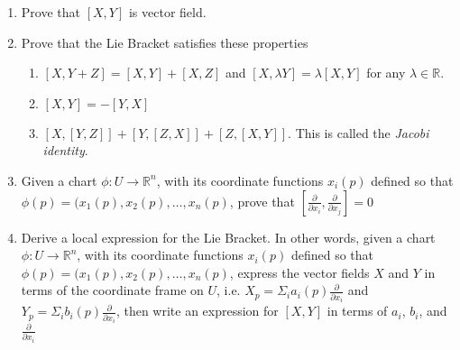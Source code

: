 \begin{enumerate}
\begin{enumerate}
\item Prove that $[X,Y]$ is vector field.
\item Prove that the Lie Bracket satisfies these properties
  \begin{enumerate}
\item $[X, Y + Z] = [X, Y] + [X, Z]$ and $[X, \lambda Y] = \lambda [X, Y]$  for any $\lambda \in \mathbb{R}$.
\item $[X, Y] = -[Y, X]$
\item $[X, [Y , Z]] + [Y, [Z , X]] + [Z, [X , Y]]$. This is called the \emph{Jacobi identity}.
  \end{enumerate}
  \item Given a chart $\phi : U \to \mathbb{R}^n$, with its coordinate functions $x_i(p)$ defined so that $\phi(p) = (x_1(p), x_2(p), \ldots, x_n(p)$, prove that $[\frac{\partial}{\partial x_i}, \frac{\partial}{\partial x_j}]=0$
    \item Derive a local expression for the Lie Bracket. In other words, given a chart $\phi : U \to \mathbb{R}^n$, with its coordinate functions $x_i(p)$ defined so that $\phi(p) = (x_1(p), x_2(p), \ldots, x_n(p)$, express the vector fields $X$ and $Y$ in terms of the coordinate frame on $U$, i.e. $X_p = \Sigma_i a_i(p) \frac{\partial}{\partial x_i}$ and $Y_p = \Sigma_i b_i(p) \frac{\partial}{\partial x_i}$, then write an expression for $[X, Y]$ in terms of $a_i$, $b_i$, and $\frac{\partial}{\partial x_i}$
    \end{enumerate}
\end{enumerate}
